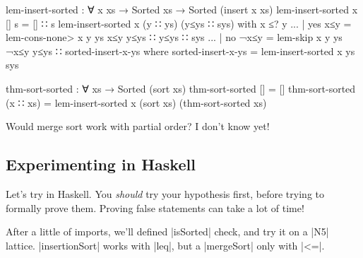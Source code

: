 \begin{code}
  lem-insert-sorted : ∀ x xs → Sorted xs → Sorted (insert x xs)
  lem-insert-sorted x [] s = [] ∷ s
  lem-insert-sorted x (y ∷ ys) (y≤ys ∷ sys) with x ≤? y
  ... | yes x≤y = lem-cons-none> x y ys x≤y y≤ys ∷ y≤ys ∷ sys
  ... | no ¬x≤y = lem-skip x y ys ¬x≤y y≤ys ∷ sorted-insert-x-ys
    where sorted-insert-x-ys = lem-insert-sorted x ys sys

  thm-sort-sorted : ∀ xs → Sorted (sort xs)
  thm-sort-sorted []       = []
  thm-sort-sorted (x ∷ xs) =
    lem-insert-sorted x (sort xs) (thm-sort-sorted xs)
\end{code}

Would merge sort work with partial order? I don't know yet!

\subsection{Experimenting in Haskell}

Let's try in Haskell.
You \emph{should} try your hypothesis first, before trying to formally
prove them. Proving false statements can take a lot of time!

After a little of imports, we'll defined
|isSorted| check, and try it on a |N5| lattice.
|insertionSort| works with |leq|, but a |mergeSort| only with |<=|.

